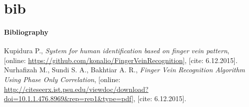\documentclass[compress]{beamer}
\begin{document}

\part{bib}
\subsection{Bibliography}
\begin{frame}
\begin{thebibliography}{10}
	Kupidura P.,
	\emph{System for human identification based on finger vein pattern},
	[online: \url{https://github.com/konalio/FingerVeinRecognition}],
	[cite: 6.12.2015].
	Nurhafizah M., Sundi S. A., Bakhtiar A. R.,
		\emph{Finger Vein Recognition Algorithm Using Phase Only Correlation},
	[online: \url{http://citeseerx.ist.psu.edu/viewdoc/download?doi=10.1.1.476.8969&rep=rep1&type=pdf}],
	[cite: 6.12.2015].

\end{thebibliography}
\end{frame}
\end{document}
